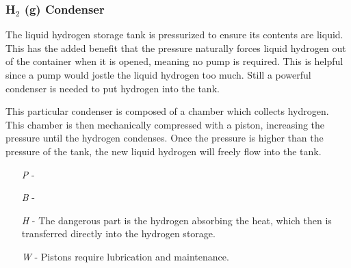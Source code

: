 \documentclass[a4paper]{article}
\begin{document}
\vspace{-0.5cm} \hspace{-18pt} \subsubsection{H$_2$ (g) Condenser} \label{engine_h2_condenser} \vspace{-0.2cm}
The liquid hydrogen storage tank is pressurized to ensure its contents are liquid. This has the added benefit that the pressure naturally forces liquid hydrogen out of the container when it is opened, meaning no pump is required. This is helpful since a pump would jostle the liquid hydrogen too much. Still a powerful condenser is needed to put hydrogen into the tank. 

This particular condenser is composed of a chamber which collects hydrogen. This chamber is then mechanically compressed with a piston, increasing the pressure until the hydrogen condenses. Once the pressure is higher than the pressure of the tank, the new liquid hydrogen will freely flow into the tank.
\begin{enumerate}
\item [\textit{P}] -  \\
\item [\textit{B}] -  \\
\item [\textit{H}] - The dangerous part is the hydrogen absorbing the heat, which then is transferred directly into the hydrogen storage.
\item [\textit{W}] - Pistons require lubrication and maintenance.
\end{enumerate}
\end{document}
